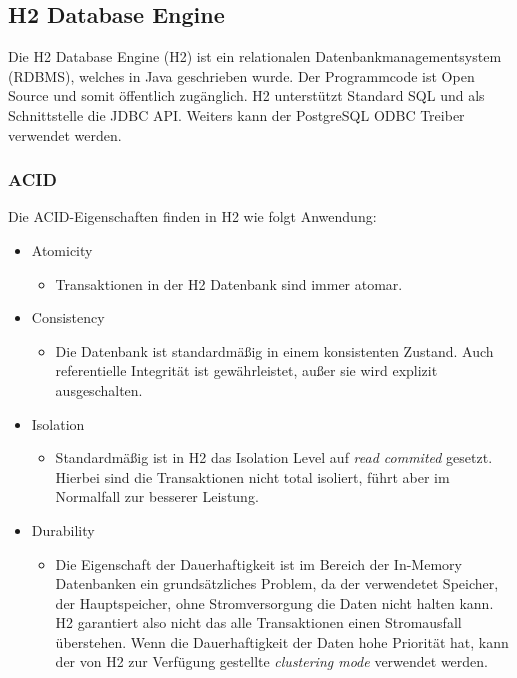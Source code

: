 \documentclass[draft,final]{vutinfth} %
\begin{document}
\subsection{H2 Database Engine}

Die H2 Database Engine (H2) ist ein relationalen Datenbankmanagementsystem (RDBMS), welches in Java geschrieben wurde. Der Programmcode ist Open Source und somit öffentlich zugänglich. H2 unterstützt Standard SQL und als Schnittstelle die JDBC API. Weiters kann der PostgreSQL ODBC Treiber verwendet werden.

\subsubsection*{ACID}
Die ACID-Eigenschaften finden in H2 wie folgt Anwendung:
\begin{itemize}
	\item Atomicity
	\begin{itemize}
		\item Transaktionen in der H2 Datenbank sind immer atomar.
	\end{itemize}
	\item Consistency
	\begin{itemize}
		\item Die Datenbank ist standardmä{\ss}ig in einem konsistenten Zustand. Auch referentielle Integrität ist gewährleistet, au\ss er sie wird explizit ausgeschalten.
	\end{itemize}
	\item Isolation
	\begin{itemize}
		\item Standardmä{\ss}ig ist in H2 das Isolation Level auf \textit{read commited} gesetzt. Hierbei sind die Transaktionen nicht total isoliert, führt aber im Normalfall zur besserer Leistung.
	\end{itemize}
	\item Durability
	\begin{itemize}
		\item Die Eigenschaft der Dauerhaftigkeit ist im Bereich der In-Memory Datenbanken ein grundsätzliches Problem, da der verwendetet Speicher, der Hauptspeicher, ohne Stromversorgung die Daten nicht halten kann. H2 garantiert also nicht das alle Transaktionen einen Stromausfall überstehen. Wenn die Dauerhaftigkeit der Daten hohe Priorität hat, kann der von H2 zur Verfügung gestellte \textit{clustering mode} verwendet werden. 
	\end{itemize}
\end{itemize}
\end{document}
